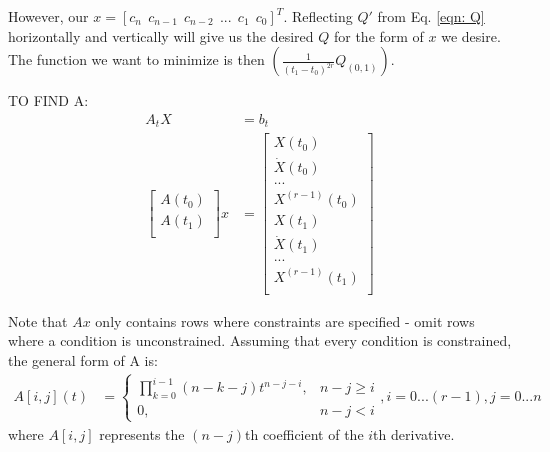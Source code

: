 \documentclass[11pt]{article}
\begin{document}
However, our $x = [c_n \ \ c_{n-1} \ \ c_{n-2} \ \ ... \ \ c_1 \ \ c_0]^T$. Reflecting $Q'$ from Eq. \ref{eqn: Q} horizontally and vertically will give us the desired $Q$ for the form of $x$ we desire. The function we want to minimize is then $\left( \frac{1}{(t_1-t_0)^{2r}} Q_{(0, 1)}\right)$. 



\mbox{} \newline
\mbox{} \newline
TO FIND A: \newline
\begin{align*}
A_t X &= b_t \\
 \begin{bmatrix}
  A(t_0) \\
  A(t_1) \\
 \end{bmatrix} 
 x 
 &= 
\begin{bmatrix}
  X(t_0) \\
  \dot{X} (t_0) \\
  ... \\
  X^{(r-1)}(t_0) \\
    X(t_1) \\
  \dot{X} (t_1) \\
  ... \\
  X^{(r-1)}(t_1) \\
 \end{bmatrix} 
\end{align*}

Note that $Ax$ only contains rows where constraints are specified - omit rows where a condition is unconstrained. Assuming that every condition is constrained, the general form of A is:
\begin{align}
\label{eqn: A} A[i, j] (t) &= 
\begin{cases}
    \prod_{k=0}^{i-1} {(n-k-j)} t^{n-j-i}, & n-j \ge i \\
    0, & n-j < i
\end{cases}, i = 0...(r-1), j = 0...n
\end{align}
where $A[i, j]$ represents the $(n-j)$th coefficient of the $i$th derivative. 
\end{document}
